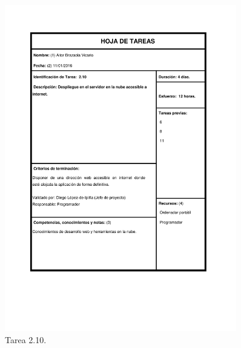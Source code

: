 \documentclass{DeustoFDP}
\begin{document}
\begin{figure}[H]
	\centering
	\includegraphics[width=0.9\textwidth]{fig/Tareas/210}
	\caption{Tarea 2.10.}
	\label{fig:t210}
\end{figure}
\end{document}
